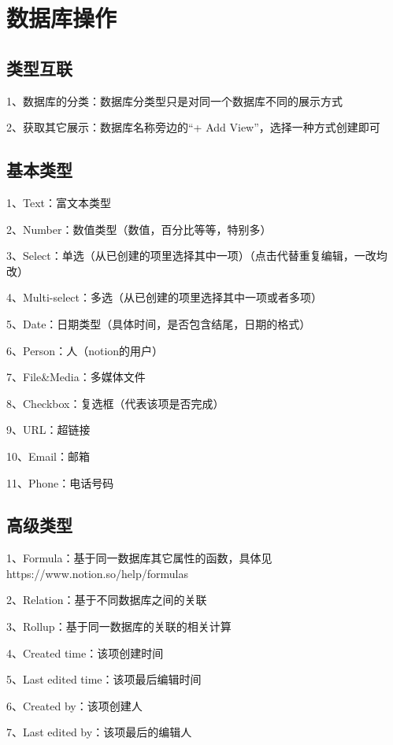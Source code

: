 \chapter{数据库操作}

\section{类型互联}

1、数据库的分类：数据库分类型只是对同一个数据库不同的展示方式

2、获取其它展示：数据库名称旁边的“+ Add View”，选择一种方式创建即可

\section{基本类型}

1、Text：富文本类型

2、Number：数值类型（数值，百分比等等，特别多）

3、Select：单选（从已创建的项里选择其中一项）（点击代替重复编辑，一改均改）

4、Multi-select：多选（从已创建的项里选择其中一项或者多项）

5、Date：日期类型（具体时间，是否包含结尾，日期的格式）

6、Person：人（notion的用户）

7、File\&Media：多媒体文件

8、Checkbox：复选框（代表该项是否完成）

9、URL：超链接

10、Email：邮箱

11、Phone：电话号码

\section{高级类型}

1、Formula：基于同一数据库其它属性的函数，具体见https://www.notion.so/help/formulas

2、Relation：基于不同数据库之间的关联

3、Rollup：基于同一数据库的关联的相关计算

4、Created time：该项创建时间

5、Last edited time：该项最后编辑时间

6、Created by：该项创建人

7、Last edited by：该项最后的编辑人

